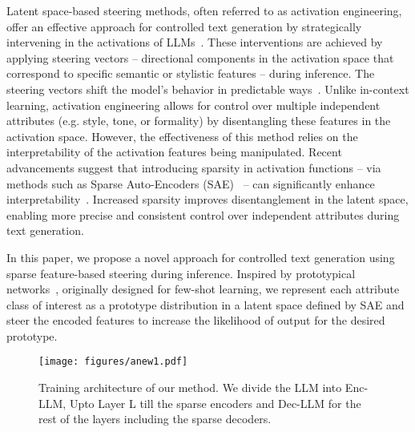 Latent space-based steering methods, often referred to as activation engineering, offer an effective approach for controlled text generation by strategically intervening in the activations of LLMs~\cite{Dathathri_Madotto_Lan_Hung_Frank_Molino_Yosinski_Liu_2019,Liu_Sap_Lu_Swayamdipta_Bhagavatula_Smith_Choi_2021,Khalifa_ElSahar_Dymetman_2020}. These interventions are achieved by applying steering vectors -- directional components in the activation space that correspond to specific semantic or stylistic features -- during inference. The steering vectors shift the model's behavior in predictable ways~\cite{hernandez2023inspecting,sun2024massive}. Unlike in-context learning, activation engineering allows for control over multiple independent attributes (e.g. style, tone, or formality) by disentangling these features in the activation space. However, the effectiveness of this method relies on the interpretability of the activation features being manipulated. Recent advancements suggest that introducing sparsity in activation functions -- via methods such as Sparse Auto-Encoders (SAE)~\cite{Makhzani2013kSparseA} -- can significantly enhance interpretability~\cite{cunningham2023sparse,bricken2023towards}. Increased sparsity improves disentanglement in the latent space, enabling more precise and consistent control over independent attributes during text generation.

\par






In this paper, we propose a novel approach for controlled text generation using sparse feature-based steering during inference. Inspired by prototypical networks~\cite{snell2017prototypical}, originally designed for few-shot learning, we represent each attribute class of interest as a prototype distribution in a latent space defined by SAE and steer the encoded features to increase the likelihood of output for the desired prototype.

\begin{figure*}[htbp]
\centering
  \texttt{[image: figures/anew1.pdf]}
  \caption{Training architecture of our method. We divide the LLM  into Enc-LLM, Upto Layer L till the sparse encoders and Dec-LLM for the rest of the layers including the sparse decoders.
}
  \label{fig:entire}
\end{figure*}

